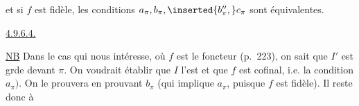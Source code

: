 et si $f$ est fidèle,  les   conditions $a_\pi,b_\pi,\inserted{b''_\pi,}c_\pi$ sont équivalentes.


\uline{4.9.6.4.}

\uline{NB} Dans le cas qui nous intéresse, où $f$ est le foncteur  (p.~223), on sait que $I'$ est grde devant $\pi$. On voudrait établir que $I$ l'est et que $f$ est cofinal, i.e. la condition $a_\pi)$. On  le prouvera en prouvant $b_\pi$ (qui implique $a_\pi$, puisque $f$ est fidèle). Il reste donc à

